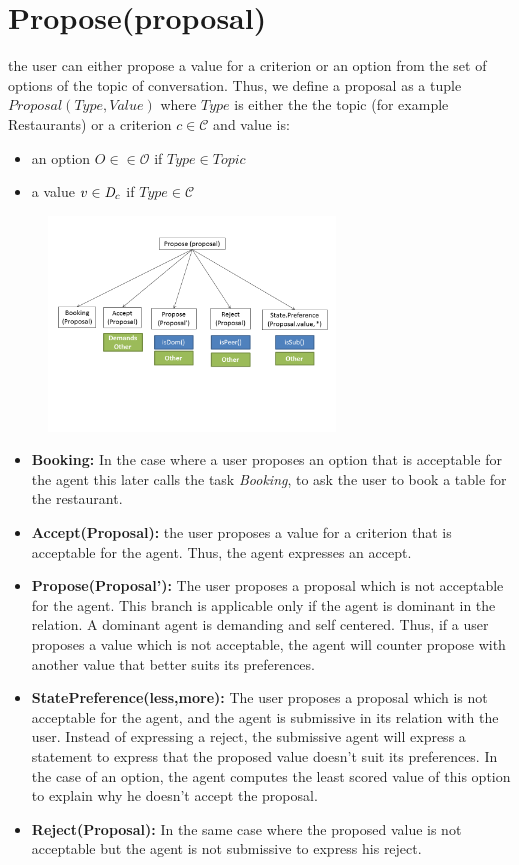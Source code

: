 \documentclass{llncs}
\begin{document}
\section{Propose(proposal)}
	the user can either propose a value for a criterion or an option from the set of options of the topic of conversation. Thus, we define a proposal as a tuple $Proposal(Type, Value)$ where  $Type$ is either the the topic (for example Restaurants) or a criterion $c \in \mathcal{C}$ and value is:
	\begin{itemize}
		\item an option $O \in \in \mathcal{O}$ if $Type \in Topic$ 
		\item a value $v \in \emph{D}_c$ if $Type \in \mathcal{C}$
	\end{itemize}
	  \begin{figure}[]
	  						\centerline{\includegraphics[width=3in]{figs/utterances_v2/Diapositive2.PNG}}
	  						\vskip 8pt
	  	\end{figure}
\begin{itemize}
	\item \textbf{Booking:} In the case where a user proposes an option that is acceptable for the agent this later calls the task \textit{Booking}, to ask the user to book a table for the restaurant. 
	\item \textbf{Accept(Proposal):} the user proposes a value for a criterion that is acceptable for the agent. Thus, the agent expresses an accept.
	\item \textbf{Propose(Proposal'):} The user proposes a proposal which is not acceptable for the agent. This branch is applicable only if the agent is dominant in the relation. A dominant agent is demanding and self centered. Thus, if a user proposes a value which is not acceptable, the agent will counter propose with another value that better suits its preferences.
	\item \textbf{StatePreference(less,more):} The user proposes a proposal which is not acceptable for the agent, and the agent is submissive in its relation with the user. Instead of expressing a reject, the submissive agent will express a statement to express that the proposed value doesn't suit its preferences.
	In the case of an option, the agent computes the least scored value of this option to explain why he doesn't accept the proposal.
	\item\textbf{Reject(Proposal):} In the same case where the proposed value is not acceptable but the agent is not submissive to express his reject.
		
\end{itemize}
\end{document}
